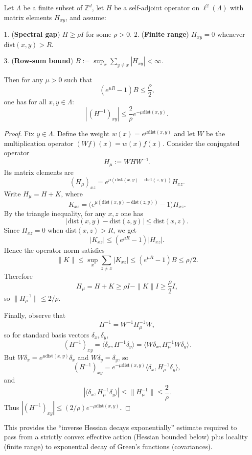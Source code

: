 \begin{lemma}
\label{lem:combes-thomas-bound-prime}
Let $\Lambda$ be a finite subset of $\mathbb Z^d$, let $H$ be a self-adjoint operator on $\ell^2(\Lambda)$ with matrix elements $H_{xy}$, and assume:

1. (\textbf{Spectral gap}) $H \ge \rho I$ for some $\rho>0$.
2. (\textbf{Finite range}) $H_{xy}=0$ whenever $\mathrm{dist}(x,y)>R$.

3. (\textbf{Row-sum bound}) $B := \sup_{x}\sum_{y\ne x} |H_{xy}| < \infty$.

Then for any $\mu>0$ such that
\[
(e^{\mu R}-1)B \le \frac{\rho}{2},
\]
one has for all $x,y\in\Lambda$:
\[
|(H^{-1})_{xy}| \le \frac{2}{\rho}e^{-\mu\mathrm{dist}(x,y)}.
\]
\end{lemma}

\begin{proof}
Fix $y\in\Lambda$. Define the weight $w(x)=e^{\mu\mathrm{dist}(x,y)}$ and let $W$ be the multiplication operator $(Wf)(x)=w(x)f(x)$. Consider the conjugated operator
\[
H_\mu := W H W^{-1}.
\]
Its matrix elements are
\[
(H_\mu)_{xz} = e^{\mu(\mathrm{dist}(x,y)-\mathrm{dist}(z,y))} H_{xz}.
\]
Write $H_\mu = H + K$, where
\[
K_{xz} = \big(e^{\mu(\mathrm{dist}(x,y)-\mathrm{dist}(z,y))}-1\big)H_{xz}.
\]
By the triangle inequality, for any $x,z$ one has
\[
|\mathrm{dist}(x,y)-\mathrm{dist}(z,y)| \le \mathrm{dist}(x,z).
\]
Since $H_{xz}=0$ when $\mathrm{dist}(x,z)>R$, we get
\[
|K_{xz}| \le (e^{\mu R}-1)|H_{xz}|.
\]
Hence the operator norm satisfies
\[
\|K\| \le \sup_x\sum_{z\ne x}|K_{xz}| \le (e^{\mu R}-1)B \le \rho/2.
\]
Therefore
\[
H_\mu = H + K \ge \rho I - \|K\| I \ge \frac{\rho}{2}I,
\]
so $\|H_\mu^{-1}\|\le 2/\rho$.

Finally, observe that
\[
H^{-1} = W^{-1} H_\mu^{-1} W,
\]
so for standard basis vectors $\delta_x,\delta_y$,
\[
(H^{-1})_{xy}=\langle \delta_x, H^{-1}\delta_y\rangle
=\langle W\delta_x, H_\mu^{-1} W\delta_y\rangle.
\]
But $W\delta_x = e^{\mu \mathrm{dist}(x,y)}\delta_x$ and $W\delta_y=\delta_y$, so
\[
(H^{-1})_{xy} = e^{-\mu \mathrm{dist}(x,y)} \langle \delta_x, H_\mu^{-1}\delta_y\rangle,
\]
and
\[
|\langle \delta_x, H_\mu^{-1}\delta_y\rangle| \le \|H_\mu^{-1}\| \le \frac{2}{\rho}.
\]
Thus $|(H^{-1})_{xy}|\le (2/\rho)e^{-\mu \mathrm{dist}(x,y)}$.
\end{proof}

This provides the ``inverse Hessian decays exponentially'' estimate required to pass from a strictly convex effective action (Hessian bounded below) plus locality (finite range) to exponential decay of Green's functions (covariances).


